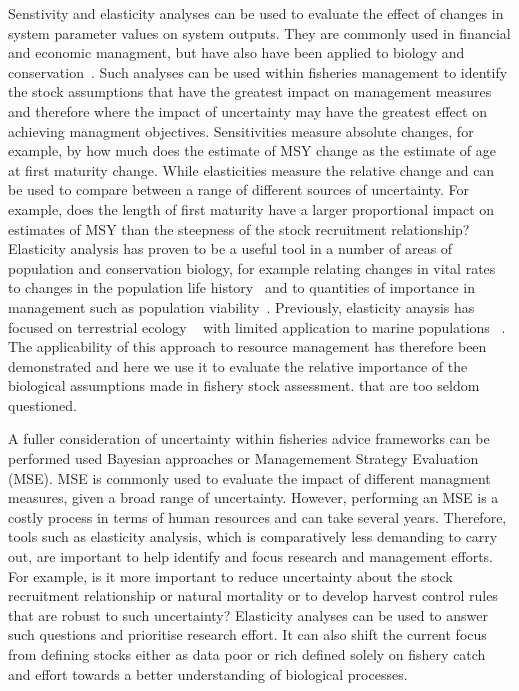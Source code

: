 \documentclass[10pt]{article}
\begin{document}
Senstivity and elasticity analyses can be used to evaluate the effect of changes in system parameter values on system outputs. They are commonly used in
financial and economic managment, but have also have been applied to biology and conservation~\cite{de1986elasticity}.
Such analyses can be used within fisheries management to identify the stock assumptions that have the greatest impact on management measures
and therefore where the impact of uncertainty may have the greatest effect on achieving managment objectives.
Sensitivities measure absolute changes, for example, by how much does the estimate of MSY change as the estimate of age at first maturity change.
While elasticities measure the relative change and can be used to compare between a range of different sources of uncertainty. For example, 
does the length of first maturity have a larger proportional impact on estimates of MSY than the steepness of the stock recruitment relationship?
Elasticity analysis has  proven to be a useful tool in a number of areas of population and conservation biology, for example relating changes in
vital rates to changes in the population life history~\cite{grant2003density} and to quantities of importance in management such as population
viability~\cite{heppell1998application}. Previously, elasticity anaysis has focused on terrestrial 
ecology ~\cite{Benton1999467, Hunter2000299, Pichancourt200631} with limited application to marine populations ~\cite{RogersBennett2006, Heppell2007}. 
The applicability of this approach to resource management has therefore been demonstrated and here we use it to evaluate the relative importance of
the biological assumptions made in fishery stock assessment. that are too seldom questioned.

A fuller consideration of uncertainty within fisheries advice frameworks can be performed used Bayesian approaches or Managemement Strategy Evaluation (MSE).
MSE is commonly used to evaluate the impact of different managment measures, given a broad range of uncertainty. However,
performing an MSE is a costly process in terms of human resources and can take several years. Therefore, tools such as elasticity analysis, which
is comparatively less demanding to carry out, are important to 
help identify and focus research and management efforts. For example, is it more important to reduce uncertainty about the stock 
recruitment relationship or natural mortality or to develop harvest control rules that are robust to such uncertainty? Elasticity analyses can 
be used to answer such questions and prioritise research effort. It can also shift the current focus from defining stocks either as data poor or rich 
defined solely on fishery catch and effort towards a better understanding of biological processes. 
\end{document}
